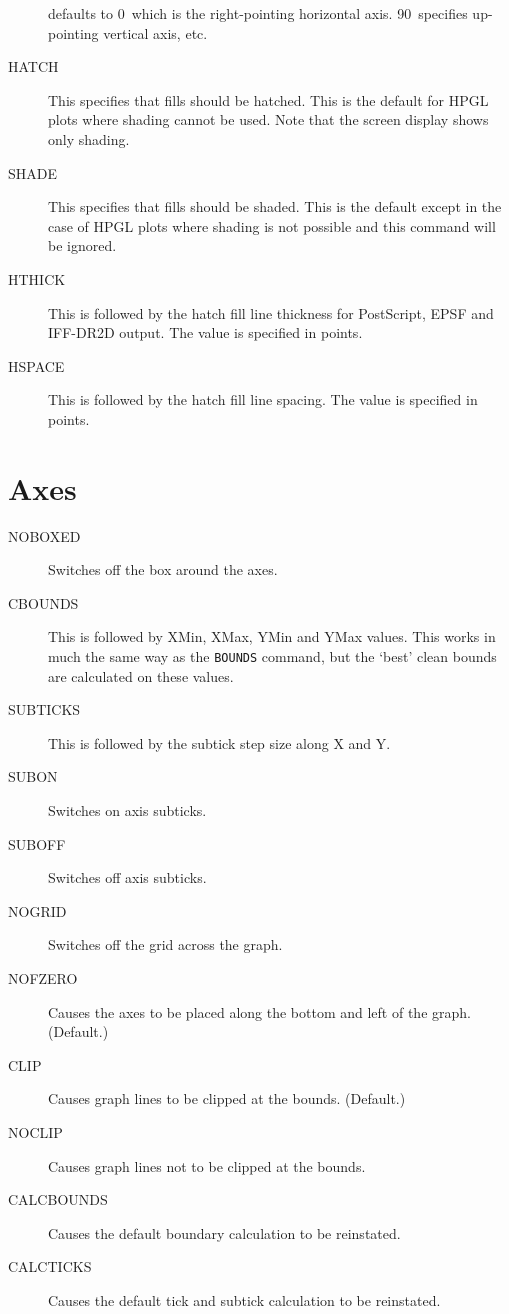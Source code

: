 \begin{description}
defaults to 0\degree\ which is the right-pointing horizontal axis. 90\degree\ 
specifies up-pointing vertical axis, etc.
\item[HATCH] This specifies that fills should be hatched. This is the default for 
HPGL plots where shading cannot be used. Note that the screen display shows only 
shading.
\item[SHADE] This specifies that fills should be shaded. This is the default except 
in the case of HPGL plots where shading is not possible and this command will be 
ignored.
\item[HTHICK] This is followed by the hatch fill line thickness for PostScript, EPSF 
and IFF-DR2D output. The value is specified in points.
\item[HSPACE] This is followed by the hatch fill line spacing. The value is 
specified in points.
\end{description}

\section{Axes}
\begin{description}
\item[NOBOXED\dag]  Switches off the box around the axes. 
\item[CBOUNDS\dag] This is followed by XMin, XMax, YMin and YMax values. This works 
in much the same way as the {\tt BOUNDS} command, but the `best' clean bounds are 
calculated on these values.
\item[SUBTICKS]  This is followed by the subtick step size along X and Y.
\item[SUBON] Switches on axis subticks.
\item[SUBOFF] Switches off axis subticks.
\item[NOGRID\dag] Switches off the grid across the graph. 
\item[NOFZERO\dag] Causes the axes to be placed along the bottom and left of the 
graph. (Default.)
\item[CLIP] Causes graph lines to be clipped at the bounds. (Default.)
\item[NOCLIP] Causes graph lines not to be clipped at the bounds.
\item[CALCBOUNDS\dag] Causes the default boundary calculation to be reinstated.
\item[CALCTICKS\dag] Causes the default tick and subtick calculation to be reinstated.
\end{description}


